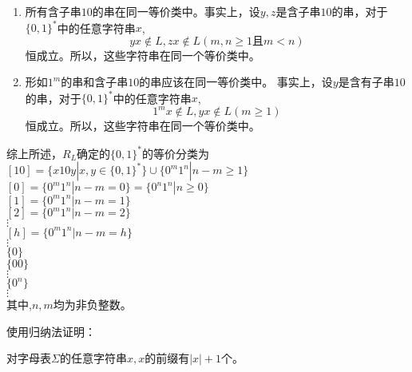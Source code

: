 \begin{solution}
\begin{enumerate}
		\item 所有含子串$10$的串在同一等价类中。事实上，设$y,z$是含子串$10$的串，对于$\{0,1\}^\ast$中的任意字符串$x$,
			$$yx\notin L,zx\notin L(m,n\ge 1\text{且}m<n)$$
		恒成立。所以，这些字符串在同一个等价类中。
		
		\item 形如$1^m$的串和含子串$10$的串应该在同一等价类中。	事实上，设$y$是含有子串$10$的串，对于$\{0,1\}^\ast$中的任意字符串$x$,
		$$1^mx\notin L,yx\notin L(m\ge 1)$$
		恒成立。所以，这些字符串在同一个等价类中。
		\end{enumerate}
	
		综上所述，$R_L$确定的$\{0,1\}^\ast$的等价分类为\\
		$[10] =\{x10y|x,y\in\{0,1\}^*\}\cup\{0^m1^n|n-m\ge 1\}$ \\
		$[0] =\{0^m1^n|n-m=0\}=\{0^n1^n|n\ge 0\}$ \\
		$[1] =\{0^m1^n|n-m=1\}$ \\
		$[2] =\{0^m1^n|n-m=2\}$ \\
		$\vdots$ \\
		$[h] =\{0^m1^n|n-m=h\}$ \\
		$\vdots$ \\
		$\{0\}$ \\
		$\{00\}$ \\
		$\vdots$ \\
		$\{0^n\}$ \\
		$\vdots$ \\
		其中,$n,m$均为非负整数。
\end{solution}

\begin{exercise} 使用归纳法证明：
	
	对字母表$\Sigma$的任意字符串$x,x$的前缀有$|x|+1$个。
\end{exercise}

